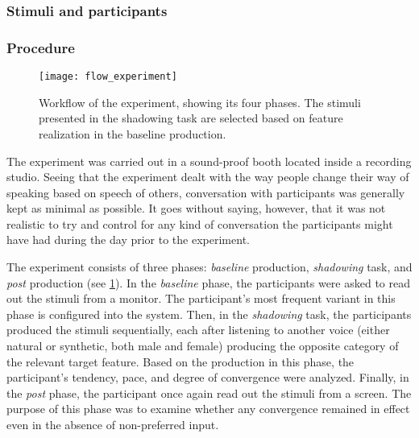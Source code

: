 

\subsubsection{Stimuli and participants}
\label{subsubsection:stimuli_participant_hci}


\subsubsection{Procedure}
\label{subsubsec:procedure_hci}

\begin{figure}[!t]
	\centering
	\texttt{[image: flow\_experiment]}
	\caption[\acs{hci} convergence experiment workflow]{Workflow of the experiment, showing its four phases. The stimuli presented in the shadowing task are selected based on feature realization in the baseline production.}
	\label{fig:HCIConvFlow}
\end{figure}

The experiment was carried out in a sound-proof booth located inside a recording studio.
Seeing that the experiment dealt with the way people change their way of speaking based on speech of others, conversation with participants was generally kept as minimal as possible.
It goes without saying, however, that it was not realistic to try and control for any kind of conversation the participants might have had during the day prior to the experiment.


The experiment consists of three phases: \emph{baseline} production, \emph{shadowing} task, and \emph{post} production (see \cref{fig:HCIConvFlow}).
In the \emph{baseline} phase, the participants were asked to read out the stimuli from a monitor.
The participant's most frequent variant in this phase is configured into the system.
Then, in the \emph{shadowing} task, the participants produced the stimuli sequentially, each after listening to another voice (either natural or synthetic, both male and female) producing the opposite category of the relevant target feature.
Based on the production in this phase, the participant's tendency, pace, and degree of convergence were analyzed.
Finally, in the \emph{post} phase, the participant once again read out the stimuli from a screen.
The purpose of this phase was to examine whether any convergence remained in effect even in the absence of non-preferred input.

